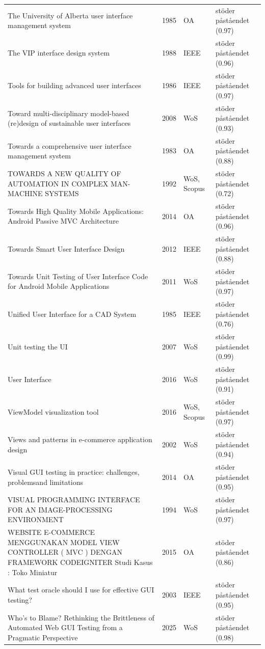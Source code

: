 \begin{longtable}{@{}%
  >{\raggedright\arraybackslash}p{}c%
  >{\raggedright\arraybackslash}p{}%
  >{\raggedright\arraybackslash}p{}@{}}
The University of Alberta user interface management system & 1985 & OA & stöder påståendet (0.97) \\
The VIP interface design system & 1988 & IEEE & stöder påståendet (0.96) \\
Tools for building advanced user interfaces & 1986 & IEEE & stöder påståendet (0.97) \\
Toward multi-disciplinary model-based (re)design of sustainable user interfaces & 2008 & WoS & stöder påståendet (0.93) \\
Towards a comprehensive user interface management system & 1983 & OA & stöder påståendet (0.88) \\
TOWARDS A NEW QUALITY OF AUTOMATION IN COMPLEX MAN-MACHINE SYSTEMS & 1992 & WoS, Scopus & stöder påståendet (0.72) \\
Towards High Quality Mobile Applications: Android Passive MVC Architecture & 2014 & OA & stöder påståendet (0.96) \\
Towards Smart User Interface Design & 2012 & IEEE & stöder påståendet (0.88) \\
Towards Unit Testing of User Interface Code for Android Mobile Applications & 2011 & WoS & stöder påståendet (0.97) \\
Unified User Interface for a CAD System & 1985 & IEEE & stöder påståendet (0.76) \\
Unit testing the UI & 2007 & WoS & stöder påståendet (0.99) \\
User Interface & 2016 & WoS & stöder påståendet (0.91) \\
ViewModel visualization tool & 2016 & WoS, Scopus & stöder påståendet (0.97) \\
Views and patterns in e-commerce application design & 2002 & WoS & stöder påståendet (0.94) \\
Visual GUI testing in practice: challenges, problemsand limitations & 2014 & OA & stöder påståendet (0.95) \\
VISUAL PROGRAMMING INTERFACE FOR AN IMAGE-PROCESSING ENVIRONMENT & 1994 & WoS & stöder påståendet (0.97) \\
WEBSITE E-COMMERCE MENGGUNAKAN MODEL VIEW CONTROLLER ( MVC ) DENGAN FRAMEWORK CODEIGNITER Studi Kasus : Toko Miniatur & 2015 & OA & stöder påståendet (0.86) \\
What test oracle should I use for effective GUI testing? & 2003 & IEEE & stöder påståendet (0.95) \\
Who's to Blame? Rethinking the Brittleness of Automated Web GUI Testing from a Pragmatic Perspective & 2025 & WoS & stöder påståendet (0.98) \\

\end{longtable}
